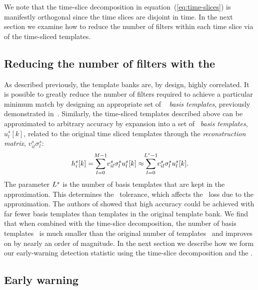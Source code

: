 We note that the time-slice decomposition in equation~(\ref{eq:time-slices}) is
manifestly orthogonal since the time slices are disjoint in time.  In the next
section we examine how to reduce the number of filters within each time slice
via \SVD{} of the time-sliced templates.

\subsection{Reducing the number of filters with the \SVD{}}

As described previously, the template banks are, by design, highly correlated.
It is possible to greatly reduce the number of filters required to achieve a
particular minimum match by designing an appropriate set of \SVD\ {\em
basis templates}, previously demonstrated
in~\cite{Cannon:2010p10398}.  Similarly, the time-sliced templates described
above can be approximated to arbitrary accuracy by expansion into a set of
\SVD\ \emph{basis templates}, $u_l^s[k]$, related to the original time
sliced templates through the \emph{reconstruction matrix},
$v_{il}^s\sigma_l^s$:
%
\begin{equation}
h_i^s[k] = \sum_{\mathclap{l=0}}^{\mathclap{M-1}} v_{il}^s \sigma_l^s u_l^s[k] \approx \sum_{\mathclap{l=0}}^{\mathclap{L^s-1}} v_{il}^s \sigma_l^s u_l^s[k].
\label{eq:svddecomp}
\end{equation}
%
%
%
The parameter $L^s$ is the number of basis templates that are kept in
the approximation.  This determines the \SVD\ tolerance, which affects the
\SNR\ loss due to the approximation.  The authors of \cite{Cannon:2010p10398}
showed that high accuracy could be achieved with far fewer basis templates than
templates in the original template bank.  We find that when combined with the
time-slice decomposition, the number of basis templates \numsvdtmps\ is much
smaller than the original number of templates \numtmps\ and improves on
\cite{Cannon:2010p10398} by nearly an order of magnitude.  In the next section
we describe how we form our early-warning detection statistic using the time-slice
decomposition and the \SVD.

\subsection{Early warning \SNR }


